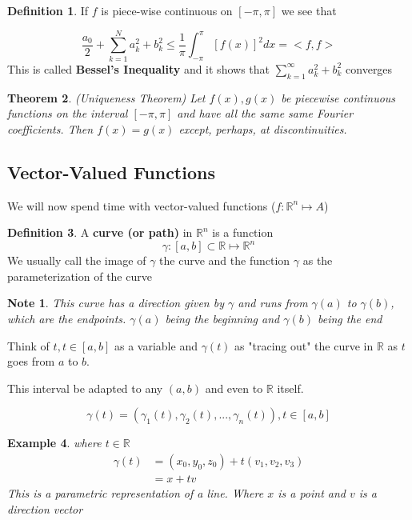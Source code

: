 \documentclass[12pt]{article}
\theoremstyle{plain}
\newtheorem*{note}{Note}
\newtheorem{theorem}{Theorem}[section]
\newtheorem{example}[theorem]{Example}
\theoremstyle{definition}
\newtheorem{definition}[theorem]{Definition}
\begin{document}
\begin{definition}
	If $f$ is piece-wise continuous on $[-\pi, \pi]$ we see that

	$$\frac{a_0}{2}+ \sum^N_{k=1} a_k^2 + b_k^2 \leq \frac{1}{\pi} \int_{-\pi}^\pi [f(x)]^2 dx = <f,f>$$
	This is called \textbf{Bessel's Inequality} and it shows that $\sum^\infty_{k=1} a_k^2 + b_k^2$ converges
\end{definition}

\begin{theorem}
(Uniqueness Theorem) Let $f(x), g(x)$ be piecewise continuous functions on the interval $[-\pi,\pi]$ and have all the same same Fourier coefficients. Then $f(x)=g(x)$ except, perhaps, at discontinuities.
\end{theorem}

\subsection{Vector-Valued Functions}

We will now spend time with vector-valued functions ($f:\mathbb{R}^n \mapsto A$)

\begin{definition}
	A \textbf{curve (or path)} in $\mathbb{R}^n$ is a function
	$$\gamma : [a,b] \subset \mathbb{R} \mapsto \mathbb{R}^n$$
	We usually call the image of $\gamma$ the curve and the function $\gamma$ as the parameterization of the curve
\end{definition}

\begin{note}
	This curve has a direction given by $\gamma$ and runs from $\gamma (a)$ to $\gamma (b)$, which are the endpoints. $\gamma (a)$ being the beginning and $\gamma (b)$ being the end
\end{note}

Think of $t, t\in [a,b]$ as a variable and $\gamma (t)$ as "tracing out" the curve in $\mathbb{R}$ as $t$ goes from $a$ to $b$.

This interval be adapted to any $(a,b)$ and even to $\mathbb{R}$ itself.

$$\gamma (t) = (\gamma_1 (t), \gamma_2 (t), ..., \gamma_n (t)), t\in[a,b]$$

\begin{example}
	where $t \in \mathbb{R}$
	\begin{align*}
		\gamma (t) &= (x_0, y_0, z_0) + t(v_1,v_2,v_3)\\
		&= x + tv
	\end{align*}
	This is a parametric representation of a line. Where $x$ is a point and $v$ is a direction vector

\end{example}
\end{document}
